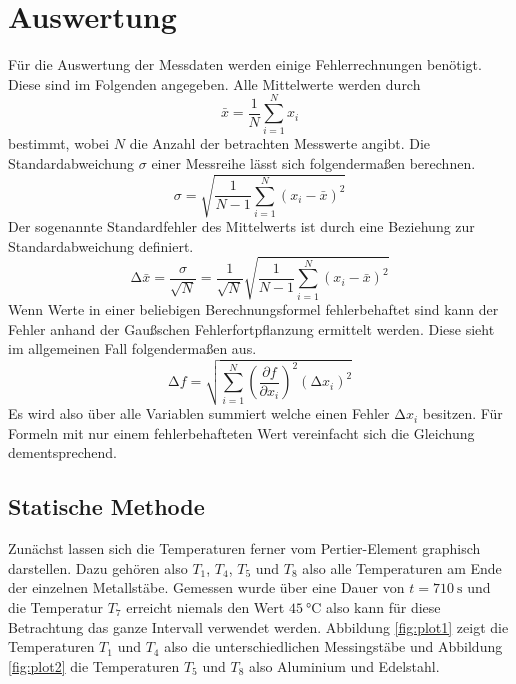 \section{Auswertung}
Für die Auswertung der Messdaten werden einige Fehlerrechnungen benötigt. Diese sind im Folgenden angegeben.
Alle Mittelwerte werden durch
\begin{equation}
\bar{x} = \frac{1}{N} \sum_{i=1}^{N} x_{i}
\end{equation}
bestimmt, wobei $N$ die Anzahl der betrachten Messwerte angibt. Die Standardabweichung $\sigma$ einer Messreihe lässt sich folgendermaßen berechnen.
\begin{equation}
\sigma = \sqrt{\frac{1}{N-1}\sum_{i=1}^{N} (x_{i} -\bar{x})^2 }
\end{equation}
Der sogenannte Standardfehler des Mittelwerts ist durch eine Beziehung zur Standardabweichung definiert.
\begin{equation}
\increment \bar{x} = \frac{\sigma}{\sqrt{N}} = \frac{1}{\sqrt{N}} \sqrt{\frac{1}{N-1}\sum_{i=1}^{N} (x_{i} -\bar{x})^2 }
\end{equation}
Wenn Werte in einer beliebigen Berechnungsformel fehlerbehaftet sind kann der Fehler anhand der Gaußschen Fehlerfortpflanzung ermittelt werden. Diese sieht im allgemeinen Fall folgendermaßen aus.
\begin{equation}
\increment f = \sqrt{\sum_{i=1}^{N} \left( \frac{\partial f}{\partial x_{i}}\right)^2 (\increment x_{i})^2}
\end{equation}
Es wird also über alle Variablen summiert welche einen Fehler $\increment x_{i}$ besitzen. Für Formeln mit nur einem fehlerbehafteten Wert vereinfacht sich die Gleichung dementsprechend.

\subsection{Statische Methode}
Zunächst lassen sich die Temperaturen ferner vom Pertier-Element graphisch darstellen. Dazu gehören also $T_{1}$, $T_{4}$, $T_{5}$ und $T_{8}$ also alle Temperaturen am Ende der einzelnen Metallstäbe.
Gemessen wurde über eine Dauer von $t = \SI{710}{\second}$ und die Temperatur $T_{7}$ erreicht niemals den Wert $\SI{45}{\celsius}$ also kann für diese Betrachtung das ganze Intervall verwendet werden.
Abbildung \ref{fig:plot1} zeigt die Temperaturen $T_{1}$ und $T_{4}$ also die unterschiedlichen Messingstäbe und Abbildung \ref{fig:plot2} die Temperaturen $T_{5}$ und $T_{8}$ also Aluminium und Edelstahl.

